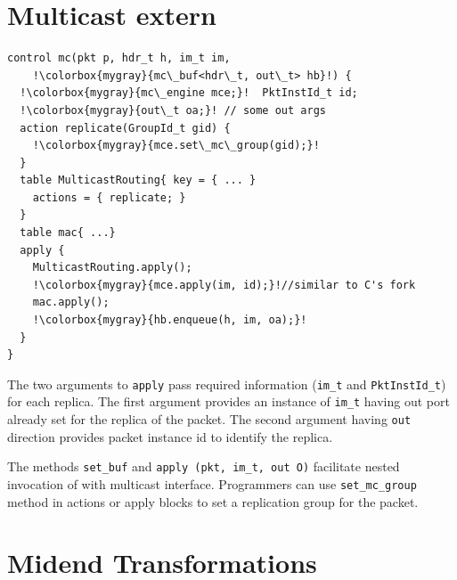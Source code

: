 \documentclass[letterpaper,twocolumn,10pt]{article}
\begin{document}
\section{Multicast extern}
\label{app:multicast}
\begin{lstlisting}[frame=none, escapechar=!]
control mc(pkt p, hdr_t h, im_t im,
    !\colorbox{mygray}{mc\_buf<hdr\_t, out\_t> hb}!) {
  !\colorbox{mygray}{mc\_engine mce;}!  PktInstId_t id; 
  !\colorbox{mygray}{out\_t oa;}! // some out args
  action replicate(GroupId_t gid) {
    !\colorbox{mygray}{mce.set\_mc\_group(gid);}!
  }
  table MulticastRouting{ key = { ... } 
    actions = { replicate; }
  }
  table mac{ ...}
  apply {
    MulticastRouting.apply();
    !\colorbox{mygray}{mce.apply(im, id);}!//similar to C's fork
    mac.apply();
    !\colorbox{mygray}{hb.enqueue(h, im, oa);}!
  }
}
\end{lstlisting}
The two arguments to \texttt{apply} pass required information
(\texttt{im\_t} and \texttt{PktInstId\_t}) for each replica. The first
argument provides an instance of \texttt{im\_t} having out port
already set for the replica of the packet.  The second argument having
\texttt{out} direction provides packet instance id to identify the
replica.

The methods \texttt{set\_buf} and \texttt{apply (pkt, im\_t, out O)}
facilitate nested invocation of \upackages with multicast interface.
Programmers can use \texttt{set\_mc\_group} method in actions or apply
blocks to set a replication group for the packet.




\section{\ucomp Midend Transformations}
\end{document}

